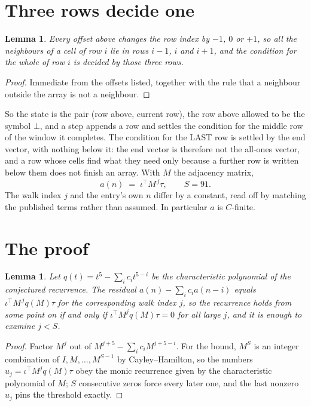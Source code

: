\documentclass[11pt,a4paper]{article}
\theoremstyle{plain}
\newtheorem{lemma}[theorem]{Lemma}
\theoremstyle{definition}
\begin{document}
\section{Three rows decide one}

\begin{lemma}\label{lem:win}
Every offset above changes the row index by $-1$, $0$ or $+1$, so all the neighbours of a cell
of row $i$ lie in rows $i-1$, $i$ and $i+1$, and the condition for the whole of row $i$ is
decided by those three rows.
\end{lemma}

\begin{proof}
Immediate from the offsets listed, together with the rule that a neighbour outside the array is
not a neighbour.
\end{proof}

So the state is the pair (row above, current row), the row above allowed to be the symbol
$\bot$, and a step appends a row and settles the condition for the middle row of the window it
completes. The condition for the LAST row is settled by the end vector, with nothing below it:
the end vector is therefore not the all-ones vector, and a row whose cells find what they need
only because a further row is written below them does not finish an array. With $M$ the
adjacency matrix,
\[
a(n)\;=\;\iota^{\!\top}M^{\,j}\tau ,\qquad S=91.
\]
The walk index $j$ and the entry's own $n$ differ by a constant, read off by matching the
published terms rather than assumed. In particular $a$ is $C$-finite.

\section{The proof}

\begin{lemma}\label{lem:crit}
Let $q(t)=t^{5}-\sum_i c_it^{5-i}$ be the characteristic polynomial of the
conjectured recurrence. The residual $a(n)-\sum_ic_ia(n-i)$ equals
$\iota^{\!\top}M^{\,j}q(M)\tau$ for the corresponding walk index $j$, so the recurrence
holds from some point on if and only if $\iota^{\!\top}M^{j}q(M)\tau=0$ for all large $j$,
and it is enough to examine $j<S$.
\end{lemma}

\begin{proof}
Factor $M^{j}$ out of $M^{j+5}-\sum_ic_iM^{j+5-i}$. For the bound, $M^{S}$
is an integer combination of $I,M,\dots,M^{S-1}$ by Cayley--Hamilton, so the numbers
$u_j=\iota^{\!\top}M^{j}q(M)\tau$ obey the monic recurrence given by the characteristic
polynomial of $M$; $S$ consecutive zeros force every later one, and the last nonzero $u_j$
pins the threshold exactly.
\end{proof}
\end{document}
